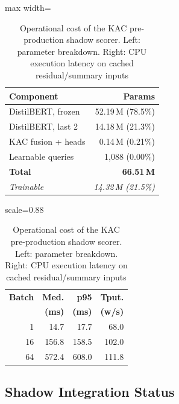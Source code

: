 \documentclass[conference]{IEEEtran}
\begin{document}
\begin{table}[t]
  \centering
  \caption{Operational cost of the KAC pre-production shadow scorer. Left: parameter breakdown. Right: CPU execution latency on cached residual/summary inputs}
  \label{tab:deployment_cost}
  \small
  \setlength{\tabcolsep}{3pt}
  \begin{minipage}[t]{0.48\linewidth}
    \centering
    \begin{adjustbox}{max width=\linewidth}
    \begin{tabular}{@{}lr@{}}
      \toprule
      \textbf{Component} & \textbf{Params} \\
      \midrule
      DistilBERT, frozen   & 52.19\,M (78.5\%) \\
      DistilBERT, last 2   & 14.18\,M (21.3\%) \\
      KAC fusion + heads   & 0.14\,M (0.21\%) \\
      Learnable queries    & 1{,}088 (0.00\%) \\
      \midrule
      \textbf{Total}       & \textbf{66.51\,M} \\
      \emph{Trainable}     & \emph{14.32\,M (21.5\%)} \\
      \bottomrule
    \end{tabular}
    \end{adjustbox}
  \end{minipage}%
  \hfill
  \begin{minipage}[t]{0.48\linewidth}
    \centering
    \begin{adjustbox}{scale=0.88}
    \begin{tabular}{@{}rrrr@{}}
      \toprule
      \textbf{Batch} & \textbf{Med.} & \textbf{p95} & \textbf{Tput.} \\
                     & \textbf{(ms)} & \textbf{(ms)} & \textbf{(w/s)} \\
      \midrule
      1  & 14.7  & 17.7  & 68.0  \\
      16 & 156.8 & 158.5 & 102.0 \\
      64 & 572.4 & 608.0 & 111.8 \\
      \bottomrule
    \end{tabular}
    \end{adjustbox}
  \end{minipage}
\end{table}

\subsection{Shadow Integration Status}
\label{sec:deployment_status}
\end{document}
